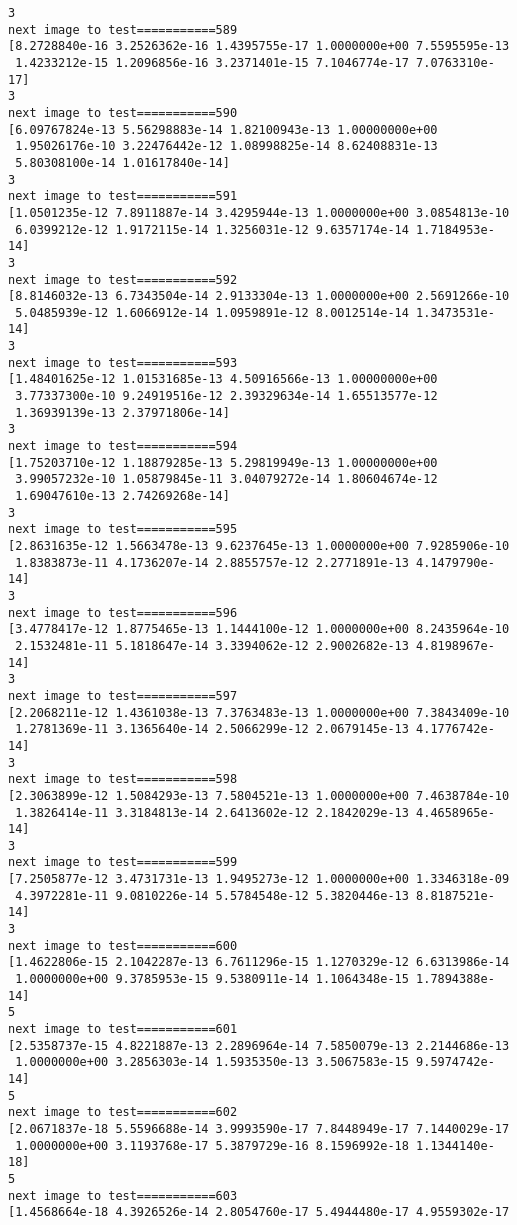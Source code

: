 \documentclass[11pt]{article}
\begin{document}
\begin{Verbatim}[commandchars=\\\{\}]
3
next image to test===========589
[8.2728840e-16 3.2526362e-16 1.4395755e-17 1.0000000e+00 7.5595595e-13
 1.4233212e-15 1.2096856e-16 3.2371401e-15 7.1046774e-17 7.0763310e-17]
3
next image to test===========590
[6.09767824e-13 5.56298883e-14 1.82100943e-13 1.00000000e+00
 1.95026176e-10 3.22476442e-12 1.08998825e-14 8.62408831e-13
 5.80308100e-14 1.01617840e-14]
3
next image to test===========591
[1.0501235e-12 7.8911887e-14 3.4295944e-13 1.0000000e+00 3.0854813e-10
 6.0399212e-12 1.9172115e-14 1.3256031e-12 9.6357174e-14 1.7184953e-14]
3
next image to test===========592
[8.8146032e-13 6.7343504e-14 2.9133304e-13 1.0000000e+00 2.5691266e-10
 5.0485939e-12 1.6066912e-14 1.0959891e-12 8.0012514e-14 1.3473531e-14]
3
next image to test===========593
[1.48401625e-12 1.01531685e-13 4.50916566e-13 1.00000000e+00
 3.77337300e-10 9.24919516e-12 2.39329634e-14 1.65513577e-12
 1.36939139e-13 2.37971806e-14]
3
next image to test===========594
[1.75203710e-12 1.18879285e-13 5.29819949e-13 1.00000000e+00
 3.99057232e-10 1.05879845e-11 3.04079272e-14 1.80604674e-12
 1.69047610e-13 2.74269268e-14]
3
next image to test===========595
[2.8631635e-12 1.5663478e-13 9.6237645e-13 1.0000000e+00 7.9285906e-10
 1.8383873e-11 4.1736207e-14 2.8855757e-12 2.2771891e-13 4.1479790e-14]
3
next image to test===========596
[3.4778417e-12 1.8775465e-13 1.1444100e-12 1.0000000e+00 8.2435964e-10
 2.1532481e-11 5.1818647e-14 3.3394062e-12 2.9002682e-13 4.8198967e-14]
3
next image to test===========597
[2.2068211e-12 1.4361038e-13 7.3763483e-13 1.0000000e+00 7.3843409e-10
 1.2781369e-11 3.1365640e-14 2.5066299e-12 2.0679145e-13 4.1776742e-14]
3
next image to test===========598
[2.3063899e-12 1.5084293e-13 7.5804521e-13 1.0000000e+00 7.4638784e-10
 1.3826414e-11 3.3184813e-14 2.6413602e-12 2.1842029e-13 4.4658965e-14]
3
next image to test===========599
[7.2505877e-12 3.4731731e-13 1.9495273e-12 1.0000000e+00 1.3346318e-09
 4.3972281e-11 9.0810226e-14 5.5784548e-12 5.3820446e-13 8.8187521e-14]
3
next image to test===========600
[1.4622806e-15 2.1042287e-13 6.7611296e-15 1.1270329e-12 6.6313986e-14
 1.0000000e+00 9.3785953e-15 9.5380911e-14 1.1064348e-15 1.7894388e-14]
5
next image to test===========601
[2.5358737e-15 4.8221887e-13 2.2896964e-14 7.5850079e-13 2.2144686e-13
 1.0000000e+00 3.2856303e-14 1.5935350e-13 3.5067583e-15 9.5974742e-14]
5
next image to test===========602
[2.0671837e-18 5.5596688e-14 3.9993590e-17 7.8448949e-17 7.1440029e-17
 1.0000000e+00 3.1193768e-17 5.3879729e-16 8.1596992e-18 1.1344140e-18]
5
next image to test===========603
[1.4568664e-18 4.3926526e-14 2.8054760e-17 5.4944480e-17 4.9559302e-17

\end{Verbatim}
\end{document}
